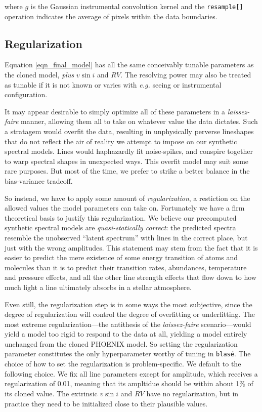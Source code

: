 \documentclass[modern]{aastex631}
\begin{document}
where $g$ is the Gaussian instrumental convolution kernel and the \texttt{resample[]} operation indicates the average of pixels within the data boundaries.

\subsection{Regularization}

Equation \ref{eqn_final_model} has all the same conceivably tunable parameters as the cloned model, \emph{plus} $v\sin{i}$ and $RV$.  The resolving power may also be treated as tunable if it is not known or varies with \emph{e.g.} seeing or instrumental configuration.

It may appear desirable to simply optimize all of these parameters in a \emph{laissez-faire} manner, allowing them all to take on whatever value the data dictates.  Such a stratagem would overfit the data, resulting in unphysically perverse lineshapes that do not reflect the air of reality we attempt to impose on our synthetic spectral models.  Lines would haphazardly fit noise-spikes, and conspire together to warp spectral shapes in unexpected ways.  This overfit model may suit some rare purposes.  But most of the time, we prefer to strike a better balance in the bias-variance tradeoff.

So instead, we have to apply some amount of \emph{regularization}, a restiction on the allowed values the model parameters can take on.  Fortunately we have a firm theoretical basis to justify this regularization.  We believe our precomputed synthetic spectral models are \emph{quasi-statically correct}: the predicted spectra resemble the unobserved ``latent spectrum'' with lines in the correct place, but just with the wrong amplitudes.  This statement may stem from the fact that it is easier to predict the mere existence of some energy transition of atoms and molecules than it is to predict their transition rates, abundances, temperature and pressure effects, and all the other line strength effects that flow down to how much light a line ultimately absorbs in a stellar atmosphere.

Even still, the regularization step is in some ways the most subjective, since the degree of regularization will control the degree of overfitting or underfitting. The most extreme regularization---the antithesis of the \emph{laissez-faire} scenario---would yield a model too rigid to respond to the data at all, yielding a model entirely unchanged from the cloned PHOENIX model.  So setting the regularization parameter constitutes the only hyperparameter worthy of tuning in \texttt{blas\'e}.  The choice of how to set the regularization is problem-specific.  We default to the following choice. We fix all line parameters except for amplitude, which receives a regularization of 0.01, meaning that its ampltidue should be within about 1\% of its cloned value.  The extrinsic $v\sin{i}$ and $RV$ have no regularization, but in practice they need to be initialized close to their plausible values.
\end{document}
